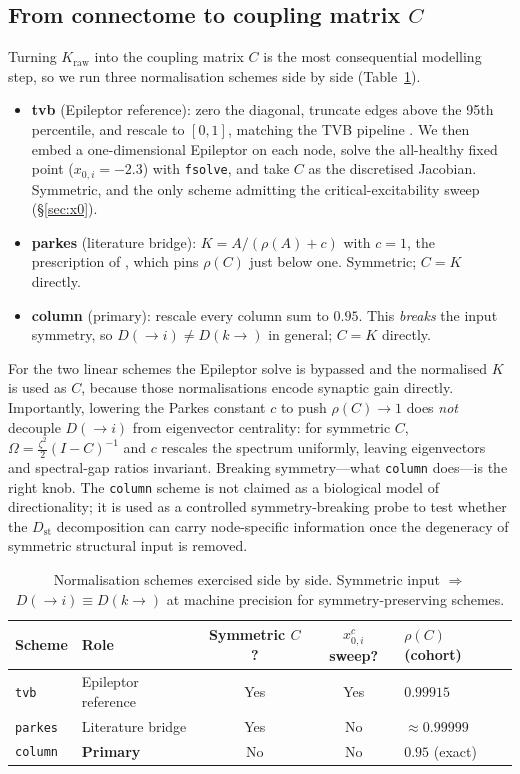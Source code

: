 \documentclass[11pt,a4paper]{article}
\newcommand{\Dst}{D_{\mathrm{st}}}
\newcommand{\Dto}{D(\!\to\! i)}
\newcommand{\Dfrom}{D(k\!\to\!)}
\newcommand{\rhoC}{\rho(C)}
\newcommand{\xcrit}{x_{0,i}^{c}}
\begin{document}
\subsection{From connectome to coupling matrix $C$}
Turning $K_{\mathrm{raw}}$ into the coupling matrix $C$ is the most consequential modelling step, so
we run three normalisation schemes side by side (Table~\ref{tab:schemes}).
\begin{itemize}\itemsep2pt
  \item \textbf{tvb} (Epileptor reference): zero the diagonal, truncate edges above the 95th
  percentile, and rescale to $[0,1]$, matching the TVB pipeline \citep{sanzleon2013}. We then embed a
  one-dimensional Epileptor on each node, solve the all-healthy fixed point ($x_{0,i}=-2.3$) with
  \texttt{fsolve}, and take $C$ as the discretised Jacobian. Symmetric, and the only scheme admitting
  the critical-excitability sweep (\S\ref{sec:x0}).
  \item \textbf{parkes} (literature bridge): $K = A/(\rho(A)+c)$ with $c=1$, the prescription of
  \citet{parkes2024}, which pins $\rhoC$ just below one. Symmetric; $C=K$ directly.
  \item \textbf{column} (primary): rescale every column sum to $0.95$. This \emph{breaks} the input
  symmetry, so $\Dto\neq\Dfrom$ in general; $C=K$ directly.
\end{itemize}
For the two linear schemes the Epileptor solve is bypassed and the normalised $K$ is used as $C$,
because those normalisations encode synaptic gain directly. Importantly, lowering the Parkes constant
$c$ to push $\rhoC\to 1$ does \emph{not} decouple $\Dto$ from eigenvector centrality: for symmetric
$C$, $\Omega=\tfrac{\zeta^2}{2}(I-C)^{-1}$ and $c$ rescales the spectrum uniformly, leaving
eigenvectors and spectral-gap ratios invariant. Breaking symmetry---what \texttt{column} does---is the
right knob. The \texttt{column} scheme is not claimed as a biological model of directionality; it is
used as a controlled symmetry-breaking probe to test whether the $\Dst$ decomposition can carry
node-specific information once the degeneracy of symmetric structural input is removed.

\begin{table}[H]
\centering
\caption{Normalisation schemes exercised side by side. Symmetric input $\Rightarrow$
$\Dto\equiv\Dfrom$ at machine precision for symmetry-preserving schemes.}
\label{tab:schemes}
\small
\begin{tabular}{@{}llccl@{}}
\toprule
Scheme & Role & Symmetric $C$? & $\xcrit$ sweep? & $\rhoC$ (cohort) \\
\midrule
\texttt{tvb}    & Epileptor reference & Yes & Yes & $0.99915$ \\
\texttt{parkes} & Literature bridge   & Yes & No  & $\approx 0.99999$ \\
\texttt{column} & \textbf{Primary}    & No  & No  & $0.95$ (exact) \\
\bottomrule
\end{tabular}
\end{table}
\end{document}
